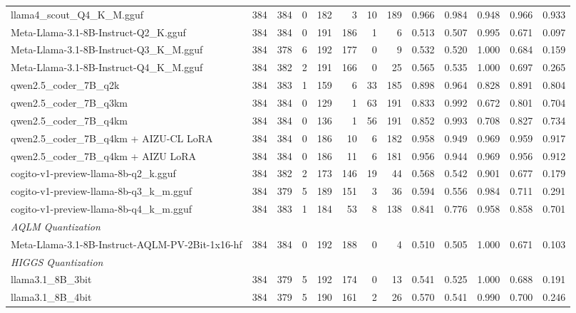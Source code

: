 \begin{table}[htbp]
{\begin{tabular}{lrrrrrrrrrrrr}
    llama4\_scout\_Q4\_K\_M.gguf & 384 & 384 & 0 & 182 & 3 & 10 & 189 & 0.966 & 0.984 & 0.948 & 0.966 & \cellcolor{green!20}0.933 \\
    Meta-Llama-3.1-8B-Instruct-Q2\_K.gguf & 384 & 384 & 0 & 191 & 186 & 1 & 6 & 0.513 & 0.507 & 0.995 & 0.671 & 0.097 \\
    Meta-Llama-3.1-8B-Instruct-Q3\_K\_M.gguf & 384 & 378 & 6 & 192 & 177 & 0 & 9 & 0.532 & 0.520 & 1.000 & 0.684 & 0.159 \\
    Meta-Llama-3.1-8B-Instruct-Q4\_K\_M.gguf & 384 & 382 & 2 & 191 & 166 & 0 & 25 & 0.565 & 0.535 & 1.000 & 0.697 & 0.265 \\
    qwen2.5\_coder\_7B\_q2k & 384 & 383 & 1 & 159 & 6 & 33 & 185 & 0.898 & 0.964 & 0.828 & 0.891 & 0.804 \\
    qwen2.5\_coder\_7B\_q3km & 384 & 384 & 0 & 129 & 1 & 63 & 191 & 0.833 & 0.992 & 0.672 & 0.801 & 0.704 \\
    qwen2.5\_coder\_7B\_q4km & 384 & 384 & 0 & 136 & 1 & 56 & 191 & 0.852 & 0.993 & 0.708 & 0.827 & 0.734 \\
    qwen2.5\_coder\_7B\_q4km + AIZU-CL LoRA & 384 & 384 & 0 & 186 & 10 & 6 & 182 & 0.958 & 0.949 & 0.969 & 0.959 & \cellcolor{green!10}0.917 \\
    qwen2.5\_coder\_7B\_q4km + AIZU LoRA & 384 & 384 & 0 & 186 & 11 & 6 & 181 & 0.956 & 0.944 & 0.969 & 0.956 & 0.912 \\
    cogito-v1-preview-llama-8b-q2\_k.gguf & 384 & 382 & 2 & 173 & 146 & 19 & 44 & 0.568 & 0.542 & 0.901 & 0.677 & 0.179 \\
    cogito-v1-preview-llama-8b-q3\_k\_m.gguf & 384 & 379 & 5 & 189 & 151 & 3 & 36 & 0.594 & 0.556 & 0.984 & 0.711 & 0.291 \\
    cogito-v1-preview-llama-8b-q4\_k\_m.gguf & 384 & 383 & 1 & 184 & 53 & 8 & 138 & 0.841 & 0.776 & 0.958 & 0.858 & 0.701 \\
    \midrule
    \multicolumn{13}{l}{\textit{AQLM Quantization}} \\
    \midrule
    Meta-Llama-3.1-8B-Instruct-AQLM-PV-2Bit-1x16-hf & 384 & 384 & 0 & 192 & 188 & 0 & 4 & 0.510 & 0.505 & 1.000 & 0.671 & 0.103 \\
    \midrule
    \multicolumn{13}{l}{\textit{HIGGS Quantization}} \\
    \midrule
    llama3.1\_8B\_3bit & 384 & 379 & 5 & 192 & 174 & 0 & 13 & 0.541 & 0.525 & 1.000 & 0.688 & 0.191 \\
    llama3.1\_8B\_4bit & 384 & 379 & 5 & 190 & 161 & 2 & 26 & 0.570 & 0.541 & 0.990 & 0.700 & 0.246 \\

\end{tabular}}
\end{table}
